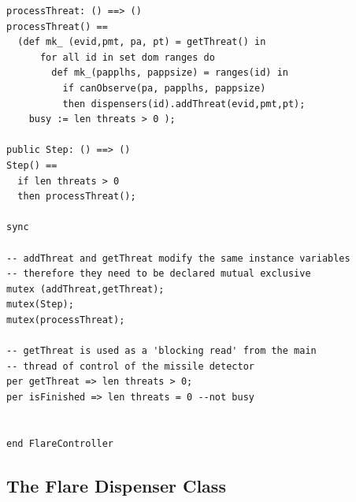 \documentclass{overturerepchap}
\begin{document}
\begin{lstlisting}
processThreat: () ==> ()
processThreat() ==
  (def mk_ (evid,pmt, pa, pt) = getThreat() in
      for all id in set dom ranges do
        def mk_(papplhs, pappsize) = ranges(id) in
          if canObserve(pa, papplhs, pappsize)
          then dispensers(id).addThreat(evid,pmt,pt);
    busy := len threats > 0 );

public Step: () ==> ()
Step() ==
  if len threats > 0
  then processThreat();

sync

-- addThreat and getThreat modify the same instance variables
-- therefore they need to be declared mutual exclusive
mutex (addThreat,getThreat);
mutex(Step);
mutex(processThreat);

-- getThreat is used as a 'blocking read' from the main
-- thread of control of the missile detector
per getThreat => len threats > 0;
per isFinished => len threats = 0 --not busy


end FlareController
\end{lstlisting}

\subsection{The Flare Dispenser Class}
\end{document}
